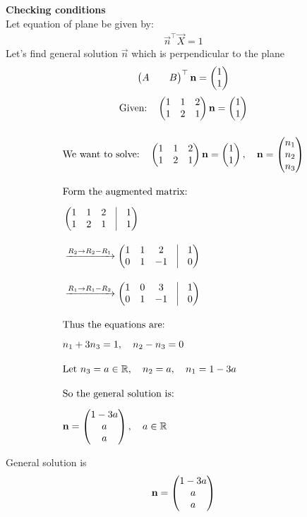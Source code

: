 \documentclass[12pt]{article}
\begin{document}
\newpage

\textbf{\large Checking conditions} \\[1cm]
Let equation of plane be given by:
\begin{align}
    \vec{n}^\top\vec{X}=1
\end{align}
Let's find general solution $\vec{n}$ which is perpendicular to the plane 
\begin{align}
    \begin{pmatrix}A && B\end{pmatrix}^\top\mathbf{n}=\begin{pmatrix}1 \\ 1\end{pmatrix}
\end{align}
\begin{align}
&\text{Given:} \quad
  \begin{pmatrix}1 & 1 & 2\\ 1 & 2 & 1\end{pmatrix}\mathbf{n} = \begin{pmatrix}1 \\ 1\end{pmatrix} \\[1em]
\end{align}
\begin{align}
&\text{We want to solve:} \quad 
\myvec{1 & 1 & 2 \\ 1 & 2 & 1}\vec{n} = \myvec{1 \\ 1}, 
\quad \vec{n} = \myvec{n_1 \\ n_2 \\ n_3} \\[1em]
%
&\text{Form the augmented matrix:} \nonumber \\[0.5em]
&\myvec{1 & 1 & 2 & \vline & 1 \\ 1 & 2 & 1 & \vline & 1} \\[1em]
%
&\xrightarrow{R_2 \to R_2 - R_1}
\myvec{1 & 1 & 2 & \vline & 1 \\ 0 & 1 & -1 & \vline & 0} \\[1em]
%
&\xrightarrow{R_1 \to R_1 - R_2}
\myvec{1 & 0 & 3 & \vline & 1 \\ 0 & 1 & -1 & \vline & 0} \\[1em]
%
&\text{Thus the equations are:} \nonumber \\[0.5em]
&n_1 + 3n_3 = 1, \quad n_2 - n_3 = 0 \\[1em]
%
&\text{Let } n_3 = a \in \mathbb{R}, \quad
n_2 = a, \quad n_1 = 1 - 3a \\[1em]
%
&\text{So the general solution is:} \nonumber \\[0.5em]
&\vec{n} = \myvec{1 - 3a \\ a \\ a}, \quad a \in \mathbb{R}
\end{align}


General solution is 
\begin{align}
\mathbf{n} = \begin{pmatrix}1 - 3a\\ a \\ a\end{pmatrix}
\end{align}
\end{document}
